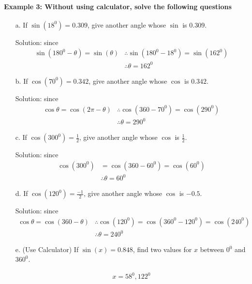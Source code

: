 \documentclass{article}
\begin{document}
\paragraph{Example 3: Without using calculator, solve the following questions}
\begin{enumerate}
  \item[a.] If $\sin(18^{0})= 0.309$, give another angle whose $\sin$ is $0.309$.
        
        {\small Solution: since}
        \[
        \begin{aligned}
          \sin(180^0-\theta) = \sin(\theta)
          &\therefore \sin(180^{0}-18^{0}) = \sin(162^{0}) \\
          &\therefore \theta = 162^{0}
        \end{aligned}
        \]

  \item[b.] If $\cos(70^{0})= 0.342$, give another angle whose $\cos$ is $0.342$.

        {\small Solution: since}
        \[
        \begin{aligned}
          \cos\theta = \cos(2\pi - \theta)
          &\therefore \cos(360-70^{0}) = \cos(290^{0}) \\
          &\therefore \theta = 290^{0}
        \end{aligned}
        \]

  \item[c.] If $\cos(300^{0})= \frac{1}{2}$, give another angle whose $\cos$ is $\frac{1}{2}$.

        {\small Solution: since}
        \[
        \begin{aligned}
          \cos(300^{0}) &= \cos(360-60^{0}) = \cos(60^{0}) \\
                       &\therefore \theta = 60^{0}
        \end{aligned}
        \]

  \item[d.] If $\cos(120^{0})= \frac{-1}{2}$, give another angle whose $\cos$ is $-0.5$.

        {\small Solution: since}
        \[
        \begin{aligned}
          \cos\theta = \cos(360-\theta)
          &\therefore \cos(120^{0}) = \cos(360^{0} - 120^{0}) = \cos(240^{0}) \\
          &\therefore \theta = 240^{0}
        \end{aligned}
        \]

  \item[e.] (Use Calculator) If $\sin(x)= 0.848$, find two values for $x$ between $0^{0}$ and $360^{0}$.

        \[
        \begin{aligned}
          x = 58^{0}, 122^{0}
        \end{aligned}
        \]
\end{enumerate}
\end{document}
